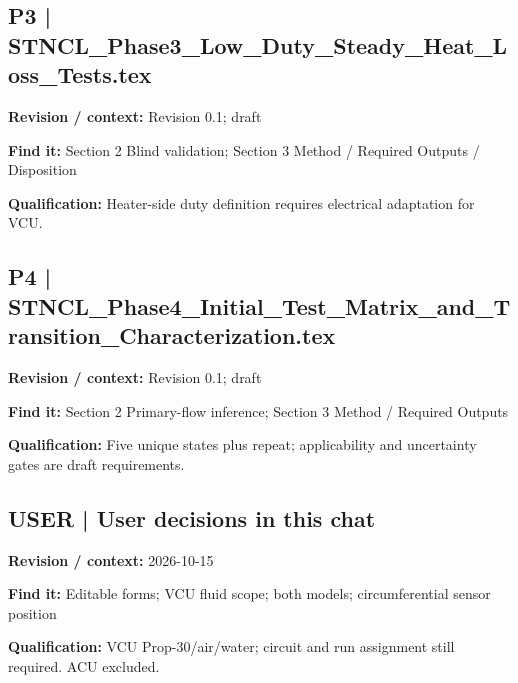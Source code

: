 \documentclass[11pt]{article}
\begin{document}
\par\noindent\begin{minipage}{\textwidth}\small
\subsection*{P3 | STNCL\_\allowbreak{}Phase3\_\allowbreak{}Low\_\allowbreak{}Duty\_\allowbreak{}Steady\_\allowbreak{}Heat\_\allowbreak{}Loss\_\allowbreak{}Tests.tex}
\textbf{Revision / context:} Revision 0.1; draft\par
\textbf{Find it:} Section 2 Blind validation; Section 3 Method / Required Outputs / Disposition\par
\textbf{Qualification:} Heater-side duty definition requires electrical adaptation for VCU.\par
\end{minipage}\par\vspace{5pt}
\par\noindent\begin{minipage}{\textwidth}\small
\subsection*{P4 | STNCL\_\allowbreak{}Phase4\_\allowbreak{}Initial\_\allowbreak{}Test\_\allowbreak{}Matrix\_\allowbreak{}and\_\allowbreak{}Transition\_\allowbreak{}Characterization.tex}
\textbf{Revision / context:} Revision 0.1; draft\par
\textbf{Find it:} Section 2 Primary-flow inference; Section 3 Method / Required Outputs\par
\textbf{Qualification:} Five unique states plus repeat; applicability and uncertainty gates are draft requirements.\par
\end{minipage}\par\vspace{5pt}
\par\noindent\begin{minipage}{\textwidth}\small
\subsection*{USER | User decisions in this chat}
\textbf{Revision / context:} 2026-10-15\par
\textbf{Find it:} Editable forms; VCU fluid scope; both models; circumferential sensor position\par
\textbf{Qualification:} VCU Prop-30/air/water; circuit and run assignment still required. ACU excluded.\par
\end{minipage}\par\vspace{5pt}
\end{document}
